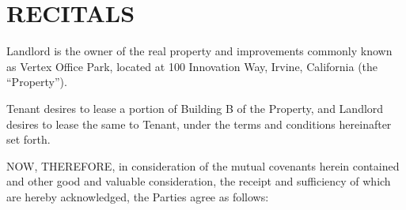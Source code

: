 \section{RECITALS}
\noindent Landlord is the owner of the real property and improvements commonly known as Vertex Office Park, located at 100 Innovation Way, Irvine, California (the ``Property'').

\noindent Tenant desires to lease a portion of Building B of the Property, and Landlord desires to lease the same to Tenant, under the terms and conditions hereinafter set forth.

\noindent NOW, THEREFORE, in consideration of the mutual covenants herein contained and other good and valuable consideration, the receipt and sufficiency of which are hereby acknowledged, the Parties agree as follows:
